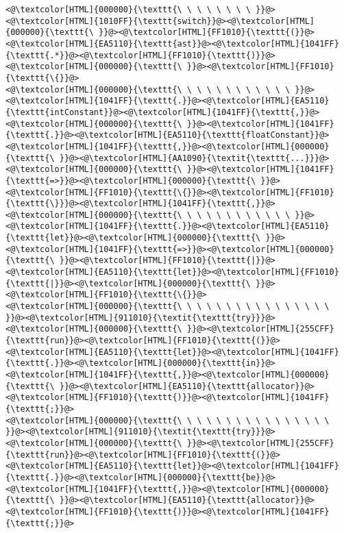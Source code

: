 \begin{lstlisting}
<@\textcolor[HTML]{000000}{\texttt{\ \ \ \ \ \ \ \ }}@><@\textcolor[HTML]{1010FF}{\texttt{switch}}@><@\textcolor[HTML]{000000}{\texttt{\ }}@><@\textcolor[HTML]{FF1010}{\texttt{(}}@><@\textcolor[HTML]{EA5110}{\texttt{ast}}@><@\textcolor[HTML]{1041FF}{\texttt{.*}}@><@\textcolor[HTML]{FF1010}{\texttt{)}}@><@\textcolor[HTML]{000000}{\texttt{\ }}@><@\textcolor[HTML]{FF1010}{\texttt{\{}}@>
<@\textcolor[HTML]{000000}{\texttt{\ \ \ \ \ \ \ \ \ \ \ \ }}@><@\textcolor[HTML]{1041FF}{\texttt{.}}@><@\textcolor[HTML]{EA5110}{\texttt{intConstant}}@><@\textcolor[HTML]{1041FF}{\texttt{,}}@><@\textcolor[HTML]{000000}{\texttt{\ }}@><@\textcolor[HTML]{1041FF}{\texttt{.}}@><@\textcolor[HTML]{EA5110}{\texttt{floatConstant}}@><@\textcolor[HTML]{1041FF}{\texttt{,}}@><@\textcolor[HTML]{000000}{\texttt{\ }}@><@\textcolor[HTML]{AA1090}{\textit{\texttt{...}}}@><@\textcolor[HTML]{000000}{\texttt{\ }}@><@\textcolor[HTML]{1041FF}{\texttt{=>}}@><@\textcolor[HTML]{000000}{\texttt{\ }}@><@\textcolor[HTML]{FF1010}{\texttt{\{}}@><@\textcolor[HTML]{FF1010}{\texttt{\}}}@><@\textcolor[HTML]{1041FF}{\texttt{,}}@>
<@\textcolor[HTML]{000000}{\texttt{\ \ \ \ \ \ \ \ \ \ \ \ }}@><@\textcolor[HTML]{1041FF}{\texttt{.}}@><@\textcolor[HTML]{EA5110}{\texttt{let}}@><@\textcolor[HTML]{000000}{\texttt{\ }}@><@\textcolor[HTML]{1041FF}{\texttt{=>}}@><@\textcolor[HTML]{000000}{\texttt{\ }}@><@\textcolor[HTML]{FF1010}{\texttt{|}}@><@\textcolor[HTML]{EA5110}{\texttt{let}}@><@\textcolor[HTML]{FF1010}{\texttt{|}}@><@\textcolor[HTML]{000000}{\texttt{\ }}@><@\textcolor[HTML]{FF1010}{\texttt{\{}}@>
<@\textcolor[HTML]{000000}{\texttt{\ \ \ \ \ \ \ \ \ \ \ \ \ \ \ \ }}@><@\textcolor[HTML]{911010}{\textit{\texttt{try}}}@><@\textcolor[HTML]{000000}{\texttt{\ }}@><@\textcolor[HTML]{255CFF}{\texttt{run}}@><@\textcolor[HTML]{FF1010}{\texttt{(}}@><@\textcolor[HTML]{EA5110}{\texttt{let}}@><@\textcolor[HTML]{1041FF}{\texttt{.}}@><@\textcolor[HTML]{000000}{\texttt{in}}@><@\textcolor[HTML]{1041FF}{\texttt{,}}@><@\textcolor[HTML]{000000}{\texttt{\ }}@><@\textcolor[HTML]{EA5110}{\texttt{allocator}}@><@\textcolor[HTML]{FF1010}{\texttt{)}}@><@\textcolor[HTML]{1041FF}{\texttt{;}}@>
<@\textcolor[HTML]{000000}{\texttt{\ \ \ \ \ \ \ \ \ \ \ \ \ \ \ \ }}@><@\textcolor[HTML]{911010}{\textit{\texttt{try}}}@><@\textcolor[HTML]{000000}{\texttt{\ }}@><@\textcolor[HTML]{255CFF}{\texttt{run}}@><@\textcolor[HTML]{FF1010}{\texttt{(}}@><@\textcolor[HTML]{EA5110}{\texttt{let}}@><@\textcolor[HTML]{1041FF}{\texttt{.}}@><@\textcolor[HTML]{000000}{\texttt{be}}@><@\textcolor[HTML]{1041FF}{\texttt{,}}@><@\textcolor[HTML]{000000}{\texttt{\ }}@><@\textcolor[HTML]{EA5110}{\texttt{allocator}}@><@\textcolor[HTML]{FF1010}{\texttt{)}}@><@\textcolor[HTML]{1041FF}{\texttt{;}}@>

\end{lstlisting}
